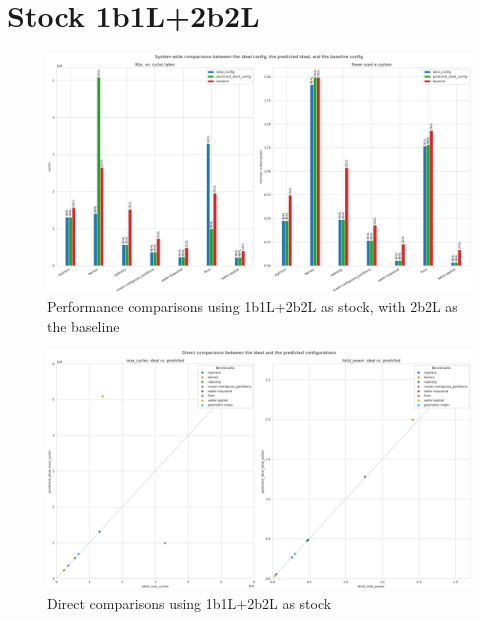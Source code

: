 \section{Stock 1b1L+2b2L}
\begin{figure}[H]
    \centering
    \includegraphics[height=0.4\textheight]{result-plots/stock-1b1L-2b2L/system-bars.png}
    \caption{Performance comparisons using 1b1L+2b2L as stock, with 2b2L as the
             baseline}
\end{figure}

\begin{figure}[H]
    \centering
    \includegraphics[height=0.4\textheight]{result-plots/stock-1b1L-2b2L/system-scatter.png}
    \caption{Direct comparisons using 1b1L+2b2L as stock}
\end{figure}

